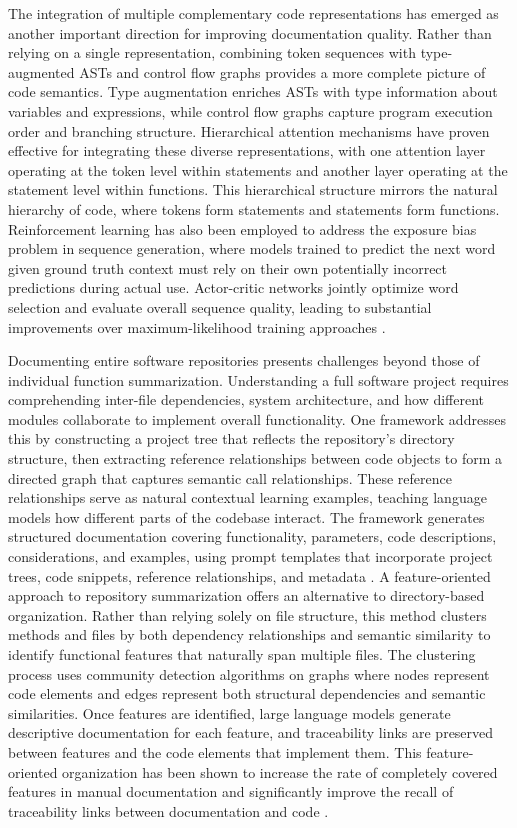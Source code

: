 The integration of multiple complementary code representations has emerged as another important direction for improving documentation quality. Rather than relying on a single representation, combining token sequences with type-augmented ASTs and control flow graphs provides a more complete picture of code semantics. Type augmentation enriches ASTs with type information about variables and expressions, while control flow graphs capture program execution order and branching structure. Hierarchical attention mechanisms have proven effective for integrating these diverse representations, with one attention layer operating at the token level within statements and another layer operating at the statement level within functions. This hierarchical structure mirrors the natural hierarchy of code, where tokens form statements and statements form functions. Reinforcement learning has also been employed to address the exposure bias problem in sequence generation, where models trained to predict the next word given ground truth context must rely on their own potentially incorrect predictions during actual use. Actor-critic networks jointly optimize word selection and evaluate overall sequence quality, leading to substantial improvements over maximum-likelihood training approaches \cite{Wang2020}.

Documenting entire software repositories presents challenges beyond those of individual function summarization. Understanding a full software project requires comprehending inter-file dependencies, system architecture, and how different modules collaborate to implement overall functionality. One framework addresses this by constructing a project tree that reflects the repository's directory structure, then extracting reference relationships between code objects to form a directed graph that captures semantic call relationships. These reference relationships serve as natural contextual learning examples, teaching language models how different parts of the codebase interact. The framework generates structured documentation covering functionality, parameters, code descriptions, considerations, and examples, using prompt templates that incorporate project trees, code snippets, reference relationships, and metadata \cite{CodeDocAgent2025}. A feature-oriented approach to repository summarization offers an alternative to directory-based organization. Rather than relying solely on file structure, this method clusters methods and files by both dependency relationships and semantic similarity to identify functional features that naturally span multiple files. The clustering process uses community detection algorithms on graphs where nodes represent code elements and edges represent both structural dependencies and semantic similarities. Once features are identified, large language models generate descriptive documentation for each feature, and traceability links are preserved between features and the code elements that implement them. This feature-oriented organization has been shown to increase the rate of completely covered features in manual documentation and significantly improve the recall of traceability links between documentation and code \cite{Zhu2025}.


